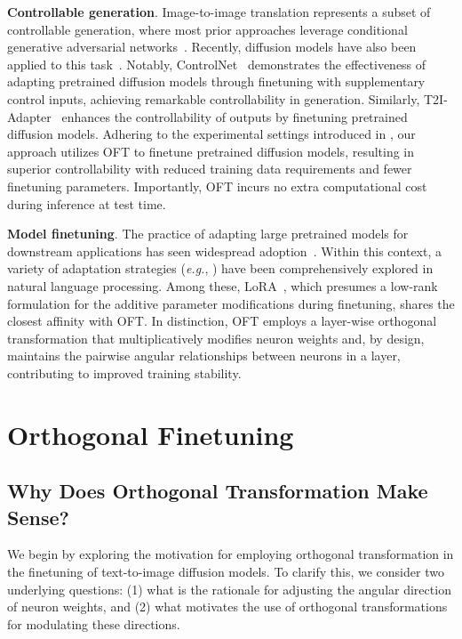 \textbf{Controllable generation}. Image-to-image translation represents a subset of controllable generation, where most prior approaches leverage conditional generative adversarial networks~\cite{isola2017image,zhu2017toward,wang2018high,park2019semantic,choi2018stargan}. Recently, diffusion models have also been applied to this task~\cite{saharia2022palette,voynov2022sketch,wang2022pretraining}. Notably, ControlNet~\cite{zhang2023adding} demonstrates the effectiveness of adapting pretrained diffusion models through finetuning with supplementary control inputs, achieving remarkable controllability in generation. Similarly, T2I-Adapter~\cite{mou2023t2i} enhances the controllability of outputs by finetuning pretrained diffusion models. Adhering to the experimental settings introduced in \cite{zhang2023adding,mou2023t2i}, our approach utilizes OFT to finetune pretrained diffusion models, resulting in superior controllability with reduced training data requirements and fewer finetuning parameters. Importantly, OFT incurs no extra computational cost during inference at test time.

\textbf{Model finetuning}. The practice of adapting large pretrained models for downstream applications has seen widespread adoption~\cite{devlin2018bert,brown2020language,he2022masked}. Within this context, a variety of adaptation strategies (\emph{e.g.}, \cite{hulora2022,houlsby2019parameter,pfeiffer2020adapterfusion}) have been comprehensively explored in natural language processing. Among these, LoRA~\cite{hulora2022}, which presumes a low-rank formulation for the additive parameter modifications during finetuning, shares the closest affinity with OFT. In distinction, OFT employs a layer-wise orthogonal transformation that multiplicatively modifies neuron weights and, by design, maintains the pairwise angular relationships between neurons in a layer, contributing to improved training stability.

\section{Orthogonal Finetuning}

\subsection{Why Does Orthogonal Transformation Make Sense?}

We begin by exploring the motivation for employing orthogonal transformation in the finetuning of text-to-image diffusion models. To clarify this, we consider two underlying questions: (1) what is the rationale for adjusting the angular direction of neuron weights, and (2) what motivates the use of orthogonal transformations for modulating these directions.

